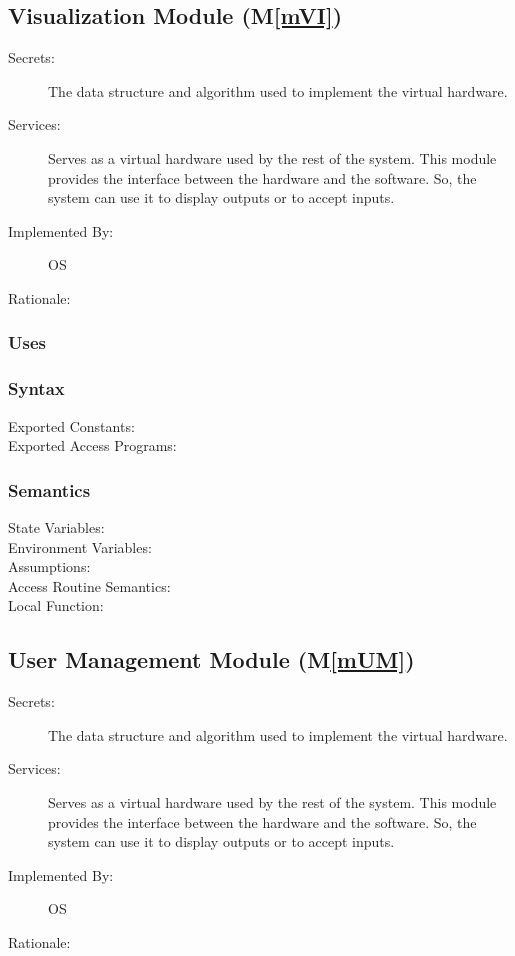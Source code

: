 \documentclass[12pt, titlepage]{article}
\newcommand{\mref}[1]{M\ref{#1}}
\begin{document}
\begin{description}
\begin{description}
\subsection{Visualization Module (\mref{mVI})}
\begin{description}
  \item[Secrets:]The data structure and algorithm used to implement the virtual
    hardware.
  \item[Services:]Serves as a virtual hardware used by the rest of the
    system. This module provides the interface between the hardware and the
    software. So, the system can use it to display outputs or to accept inputs.
  \item[Implemented By:] OS
  \item[Rationale:] 
\end{description}

\subsubsection{Uses}

\subsubsection{Syntax}
\begin{description}
  \item[Exported Constants:] 
  \item[Exported Access Programs:] 
\end{description}

\subsubsection{Semantics}
\begin{description}
  \item[State Variables:]
  \item[Environment Variables:]  
  \item[Assumptions:] 
  \item[Access Routine Semantics:] 
  \item[Local Function:] 
\end{description}

\subsection{User Management Module (\mref{mUM})}
\begin{description}
  \item[Secrets:]The data structure and algorithm used to implement the virtual
    hardware.
  \item[Services:]Serves as a virtual hardware used by the rest of the
    system. This module provides the interface between the hardware and the
    software. So, the system can use it to display outputs or to accept inputs.
  \item[Implemented By:] OS
  \item[Rationale:] 
\end{description}


\end{description}
\end{description}
\end{document}
